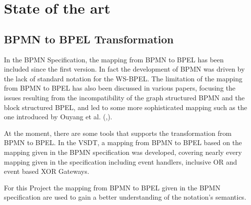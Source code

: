 \chapter{State of the art}
\label{chap:sota}
\section{BPMN to BPEL Transformation}
In the BPMN Specification, the mapping from BPMN to BPEL has been included since the first version. In fact the development of BPMN was driven by the lack of standard notation for the WS-BPEL\cite{weidlich2008}. The limitation of the mapping from BPMN to BPEL has also been discussed in various papers, focusing the issues resulting from the incompatibility of the graph structured BPMN and the block structured BPEL, and led to some more sophisticated mapping such as the one introduced by Ouyang et al. (\cite{Ouyang2006a},\cite{Ouyang2006b}).

At the moment, there are some tools that supports the transformation from BPMN to BPEL. 
In the VSDT, a mapping from BPMN to BPEL based on the mapping given in the BPMN specification was developed, covering nearly every mapping given in the specification including event handlers, inclusive OR and event based XOR Gateways. 

For this Project the mapping from BPMN to BPEL given in the BPMN specification are used to gain a better understanding of the notation's semantics.


